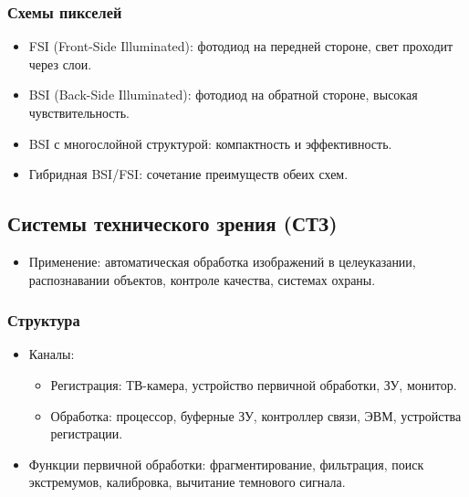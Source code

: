 	\subsubsection{Схемы пикселей}
	\begin{itemize}
		\item FSI (Front-Side Illuminated): фотодиод на передней стороне, свет проходит через слои.
		\item BSI (Back-Side Illuminated): фотодиод на обратной стороне, высокая чувствительность.
		\item BSI с многослойной структурой: компактность и эффективность.
		\item Гибридная BSI/FSI: сочетание преимуществ обеих схем.
	\end{itemize}
	
	\subsection{Системы технического зрения (СТЗ)}
	
	\begin{itemize}
		\item Применение: автоматическая обработка изображений в целеуказании, распознавании объектов, контроле качества, системах охраны.
	\end{itemize}
	
	\subsubsection{Структура}
	\begin{itemize}
		\item Каналы:
		\begin{itemize}
			\item Регистрация: ТВ-камера, устройство первичной обработки, ЗУ, монитор.
			\item Обработка: процессор, буферные ЗУ, контроллер связи, ЭВМ, устройства регистрации.
		\end{itemize}
		\item Функции первичной обработки: фрагментирование, фильтрация, поиск экстремумов, калибровка, вычитание темнового сигнала.
	\end{itemize}
	

